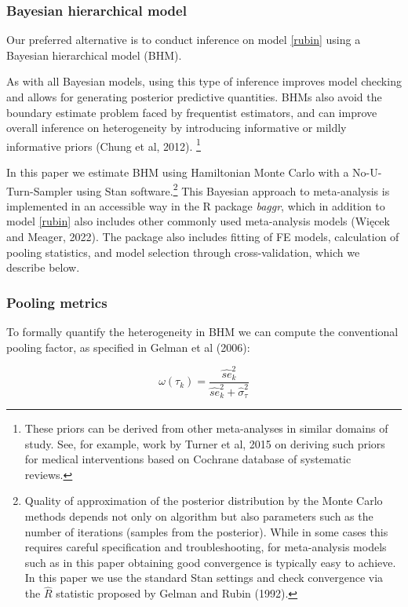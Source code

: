\documentclass[12pt]{article}
\begin{document}
\subsubsection*{Bayesian hierarchical model}

Our preferred alternative is to conduct inference on model \eqref{rubin} using a Bayesian hierarchical model (BHM). 

As with all Bayesian models, using this type of inference improves model checking and allows for generating posterior predictive quantities. BHMs also avoid the boundary estimate problem faced by frequentist estimators, and can improve overall inference on heterogeneity by introducing informative or mildly informative priors (Chung et al, 2012). \footnote{These priors can be derived from other meta-analyses in similar domains of study. See, for example, work by Turner et al, 2015 on deriving such priors for medical interventions based on Cochrane database of systematic reviews.} 

In this paper we estimate BHM using Hamiltonian Monte Carlo with a No-U-Turn-Sampler using Stan software.\footnote{Quality of approximation of the posterior distribution by the Monte Carlo methods depends not only on algorithm but also parameters such as the number of iterations (samples from the posterior). While in some cases this requires careful specification and troubleshooting, for meta-analysis models such as in this paper obtaining good convergence is typically easy to achieve. In this paper we use the standard Stan settings and check convergence via the $\hat{R}$ statistic proposed by Gelman and Rubin (1992).} This Bayesian approach to meta-analysis is implemented in an accessible way in the R package \textit{baggr}, which in addition to model \eqref{rubin} also includes other commonly used meta-analysis models (Więcek and Meager, 2022). The package also includes fitting of FE models, calculation of pooling statistics, and model selection through cross-validation, which we describe below.



\subsubsection*{Pooling metrics}

To formally quantify the heterogeneity in BHM we can compute the conventional pooling factor, as specified in Gelman et al (2006):

\begin{equation}
\omega(\tau_k) = \frac{\hat{se}^2_k }{\hat{se}^2_k + \hat{\sigma}_{\tau}^2 }
\end{equation}
\end{document}
